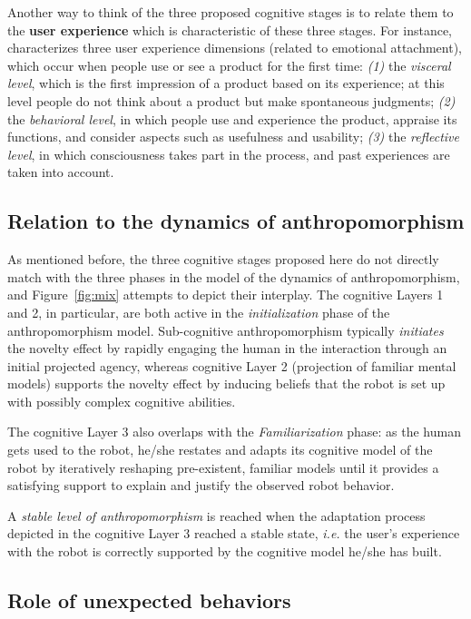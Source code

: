 \documentclass{frontiersSCNS} %
\newcommand{\ie}{\textit{i.e.}\xspace}
\begin{document}
Another way to think of the three proposed cognitive stages is to relate them to
the \textbf{user experience} which is characteristic of these three stages. For
instance, \cite{norman_emotional_2003} characterizes  three user experience
dimensions (related to emotional attachment), which occur when people use or see
a product for the first time: \emph{(1)} the \emph{visceral level}, which is the
first impression of a product based on its experience; at this level people do
not think about a product but make spontaneous judgments; \emph{(2)} the
\emph{behavioral level}, in which people use and experience the product,
appraise its functions, and consider aspects such as usefulness and usability;
\emph{(3)} the \emph{reflective level}, in which consciousness takes part in the
process, and past experiences are taken into account.

\subsection{Relation to the dynamics of anthropomorphism}
\label{sec:relations}

As mentioned before, the three cognitive stages proposed here do not directly
match with the three phases in the model of the dynamics of anthropomorphism,
and Figure~\ref{fig:mix} attempts to depict their interplay.
The cognitive Layers 1 and 2, in particular, are both active in the
\emph{initialization} phase of the anthropomorphism model. Sub-cognitive
anthropomorphism typically \emph{initiates} the novelty effect by rapidly
engaging the human in the interaction through an initial projected agency,
whereas cognitive Layer 2 (projection of familiar mental models) supports the
novelty effect by inducing beliefs that the robot is set up with possibly
complex cognitive abilities.

The cognitive Layer 3 also overlaps with the \emph{Familiarization} phase: as
the human gets used to the robot, he/she restates and adapts its
cognitive model of the robot by iteratively reshaping pre-existent, familiar
models until it provides a satisfying support to explain and justify the
observed robot behavior.

A \emph{stable level of anthropomorphism} is reached when the adaptation process
depicted in the cognitive Layer 3 reached a stable state, \ie the user's
experience with the robot is correctly supported by the cognitive model he/she
has built.


\subsection{Role of unexpected behaviors}
\label{sec:disruptive}
\end{document}
